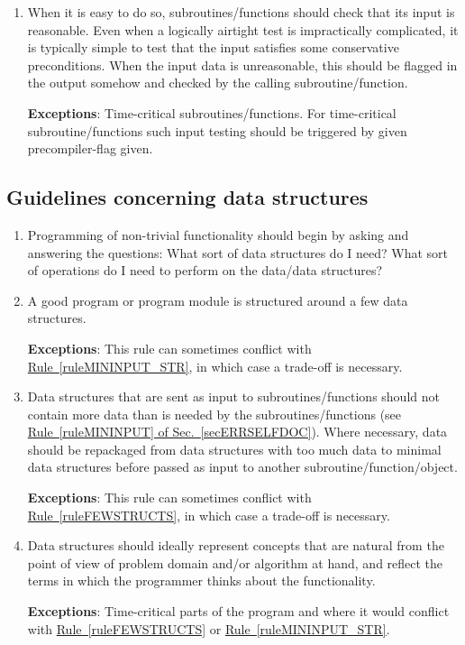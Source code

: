 \documentclass[preprint,aps]{revtex4}
\newcommand \progexception[1] {{\bf Exceptions}: {#1}}
\newcommand \ruleref[1] {\underline{Rule~\ref{#1}}}
\newcommand \rulesecref[2] {\underline{Rule~\ref{#1} of Sec.~\ref{#2}}}
\begin{document}
\begin{enumerate}
    \progexception{See \rulesecref{ruleFEWSTRUCTS}{secDATASTRUCT}.}
\item When it is easy to do so, subroutines/functions should check that
    its input is reasonable. Even when a logically airtight test is
    impractically complicated, it is typically simple to test that the
    input satisfies some conservative preconditions. When the input
    data is unreasonable, this should be flagged in the output somehow
    and checked by the calling subroutine/function.

    \progexception{Time-critical subroutines/functions.  For
    time-critical subroutine/functions such input testing should be
    triggered by given precompiler-flag given.}
\end{enumerate}

\subsection{Guidelines concerning data structures}

\label{secDATASTRUCT}

\begin{enumerate}
\item Programming of non-trivial functionality should begin by asking
    and answering the questions: What sort of data structures do I
    need?  What sort of operations do I need to perform on the
    data/data structures?
\item \label{ruleFEWSTRUCTS} A good program or program module is
    structured around a few data structures.

    \progexception{This rule can sometimes conflict with
    \ruleref{ruleMININPUT_STR}, in which case a trade-off is necessary.}
\item \label{ruleMININPUT_STR} Data structures that are sent as input
    to subroutines/functions should not contain more data than is
    needed by the subroutines/functions (see
    \rulesecref{ruleMININPUT}{secERRSELFDOC}). Where necessary, data
    should be repackaged from data structures with too much data to
    minimal data structures before passed as input to another
    subroutine/function/object.

    \progexception{This rule can sometimes conflict with
    \ruleref{ruleFEWSTRUCTS}, in which case a trade-off is
    necessary.}
\item Data structures should ideally represent concepts that are natural
    from the point of view of problem domain and/or algorithm at hand,
    and reflect the terms in which the programmer thinks about the
    functionality.

    \progexception{Time-critical parts of the program and where it
    would conflict with \ruleref{ruleFEWSTRUCTS} or
    \ruleref{ruleMININPUT_STR}.}
\end{enumerate}
\end{document}
